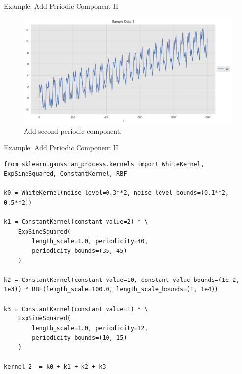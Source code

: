 \documentclass[10pt]{beamer}
\begin{document}
\begin{frame}{Example: Add Periodic Component II }
\begin{center}
\begin{figure}
\includegraphics[scale=0.4]{images/gaussian_process_time_series_files/gaussian_process_time_series_56_0.png} 
\caption{Add second periodic component.}
\end{figure}
\end{center}
\end{frame}


\begin{frame}[fragile]{Example: Add Periodic Component II }
\begin{lstlisting}
from sklearn.gaussian_process.kernels import WhiteKernel, ExpSineSquared, ConstantKernel, RBF

k0 = WhiteKernel(noise_level=0.3**2, noise_level_bounds=(0.1**2, 0.5**2))

k1 = ConstantKernel(constant_value=2) * \ 
    ExpSineSquared(
        length_scale=1.0, periodicity=40, 
        periodicity_bounds=(35, 45)
    )

k2 = ConstantKernel(constant_value=10, constant_value_bounds=(1e-2, 1e3)) * RBF(length_scale=100.0, length_scale_bounds=(1, 1e4)) 

k3 = ConstantKernel(constant_value=1) * \ 
    ExpSineSquared(
        length_scale=1.0, periodicity=12, 
        periodicity_bounds=(10, 15)
    )

kernel_2  = k0 + k1 + k2 + k3
\end{lstlisting}
\end{frame}
\end{document}
